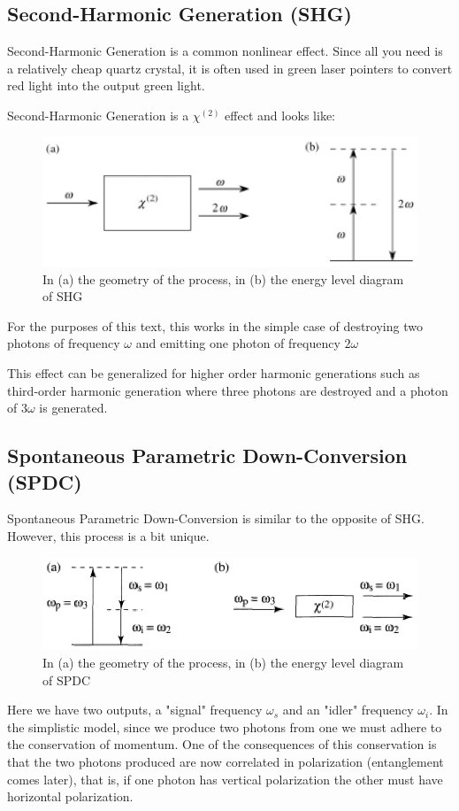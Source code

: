 \documentclass{article}
\begin{document}
\subsection{Second-Harmonic Generation (SHG)}
Second-Harmonic Generation is a common nonlinear effect. Since all you need is a relatively cheap quartz crystal, it is often used in green laser pointers to convert red light into the output green light.

Second-Harmonic Generation is a $\chi^{(2)}$ effect and looks like:
\begin{figure}[!phbt]
    \centering
    \includegraphics[width=0.55\linewidth]{img/shg.eps}
    \caption{In (a) the geometry of the process, in (b) the energy level diagram of SHG}
    \label{fig:shg}
\end{figure}

For the purposes of this text, this works in the simple case of destroying two photons of frequency $\omega$ and emitting one photon of frequency $2\omega$

This effect can be generalized for higher order harmonic generations such as third-order harmonic generation where three photons are destroyed and a photon of $3\omega$ is generated.
\pagebreak

\subsection{Spontaneous Parametric Down-Conversion (SPDC)}
Spontaneous Parametric Down-Conversion is similar to the opposite of SHG. However, this process is a bit unique.
\begin{figure}[!phbt]
    \centering
    \includegraphics[width=0.65\linewidth]{img/spdc.eps}
    \caption{In (a) the geometry of the process, in (b) the energy level diagram of SPDC}
    \label{fig:spdc}
\end{figure}

Here we have two outputs, a "signal" frequency $\omega_s$ and an "idler" frequency $\omega_i$.
In the simplistic model, since we produce two photons from one we must adhere to the conservation of momentum. One of the consequences of this conservation is that the two photons produced are now correlated  in polarization (entanglement comes later), that is, if one photon has vertical polarization the other must have horizontal polarization.
\end{document}
